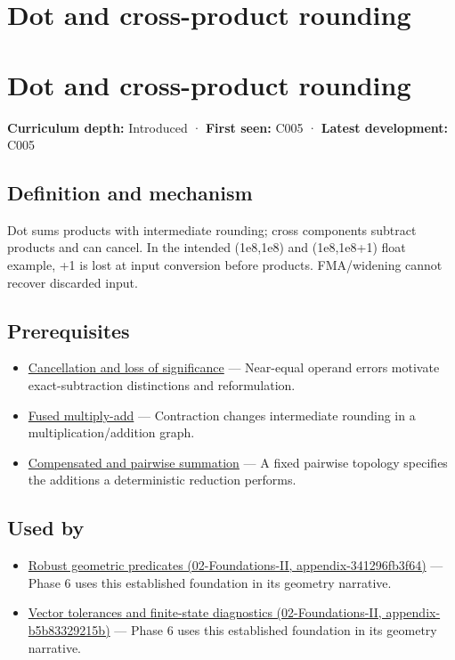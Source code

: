 \hypertarget{appendix-5aef4f13483a}{}
\section*{Dot and cross-product rounding}
\section{Dot and cross-product rounding}\label{dot-and-cross-product-rounding}

\textbf{Curriculum depth:} Introduced · \textbf{First seen:} C005 · \textbf{Latest development:} C005

\subsection{Definition and mechanism}\label{definition-and-mechanism}

Dot sums products with intermediate rounding; cross components subtract products and can cancel. In the intended (1e8,1e8) and (1e8,1e8+1) float example, +1 is lost at input conversion before products. FMA/widening cannot recover discarded input.

\subsection{Prerequisites}\label{prerequisites}

\begin{itemize}
\tightlist
\item
  \hyperref[appendix-a2773a6a2f9d]{Cancellation and loss of significance} --- Near-equal operand errors motivate exact-subtraction distinctions and reformulation.
\item
  \hyperref[appendix-41e8ef22a21e]{Fused multiply-add} --- Contraction changes intermediate rounding in a multiplication/addition graph.
\item
  \hyperref[appendix-df318da57389]{Compensated and pairwise summation} --- A fixed pairwise topology specifies the additions a deterministic reduction performs.
\end{itemize}

\subsection{Used by}\label{used-by}

\begin{itemize}
\tightlist
\item
  \href{}{Robust geometric predicates (02-Foundations-II, appendix-341296fb3f64)} --- Phase 6 uses this established foundation in its geometry narrative.
\item
  \href{}{Vector tolerances and finite-state diagnostics (02-Foundations-II, appendix-b5b83329215b)} --- Phase 6 uses this established foundation in its geometry narrative.
\end{itemize}

